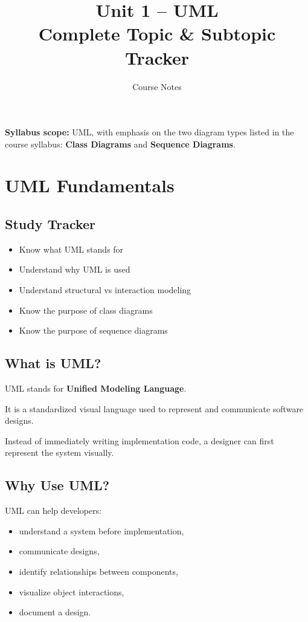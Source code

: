 \documentclass[11pt,a4paper]{article}
\title{\vspace{-1cm}\textbf{Unit 1 -- UML}\\
\large Complete Topic \& Subtopic Tracker}
\author{Course Notes}
\date{}
\newcommand{\checkitem}{$\square$}
\begin{document}
\maketitle

\begin{conceptbox}
\textbf{Syllabus scope:} UML, with emphasis on the two diagram types listed
in the course syllabus: \textbf{Class Diagrams} and \textbf{Sequence Diagrams}.
\end{conceptbox}

\tableofcontents
\newpage

\section{UML Fundamentals}

\subsection{Study Tracker}

\begin{itemize}[label=\checkitem]
    \item Know what UML stands for
    \item Understand why UML is used
    \item Understand structural vs interaction modeling
    \item Know the purpose of class diagrams
    \item Know the purpose of sequence diagrams
\end{itemize}

\subsection{What is UML?}

UML stands for \textbf{Unified Modeling Language}.

It is a standardized visual language used to represent and communicate
software designs.

Instead of immediately writing implementation code, a designer can first
represent the system visually.

\subsection{Why Use UML?}

UML can help developers:

\begin{itemize}
    \item understand a system before implementation,
    \item communicate designs,
    \item identify relationships between components,
    \item visualize object interactions,
    \item document a design.
\end{itemize}
\end{document}
